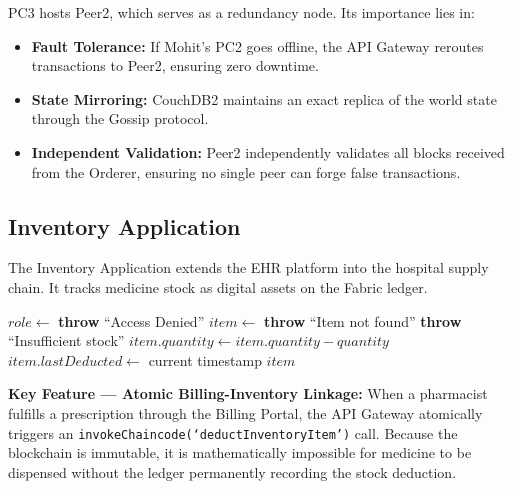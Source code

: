 PC3 hosts Peer2, which serves as a redundancy node. Its importance lies in:

\begin{itemize}
    \item \textbf{Fault Tolerance:} If Mohit's PC2 goes offline, the API Gateway reroutes transactions to Peer2, ensuring zero downtime.
    \item \textbf{State Mirroring:} CouchDB2 maintains an exact replica of the world state through the Gossip protocol.
    \item \textbf{Independent Validation:} Peer2 independently validates all blocks received from the Orderer, ensuring no single peer can forge false transactions.
\end{itemize}

\subsection{Inventory Application}

The Inventory Application extends the EHR platform into the hospital supply chain. It tracks medicine stock as digital assets on the Fabric ledger.

\begin{algorithm}[H]
\caption{Inventory Deduction with Fraud Prevention}
\label{alg:inventory}
\begin{algorithmic}[1]
    \State $role \gets$ 
        \State \textbf{throw} ``Access Denied''
    \EndIf
    \State $item \gets$ 
        \State \textbf{throw} ``Item not found''
    \EndIf
        \State \textbf{throw} ``Insufficient stock''
    \EndIf
    \State $item.quantity \gets item.quantity - quantity$
    \State $item.lastDeducted \gets$ current timestamp
    \State {}
    \State \Return $item$
\EndProcedure
\end{algorithmic}
\end{algorithm}

\textbf{Key Feature — Atomic Billing-Inventory Linkage:} When a pharmacist fulfills a prescription through the Billing Portal, the API Gateway atomically triggers an \texttt{invokeChaincode(`deductInventoryItem')} call. Because the blockchain is immutable, it is mathematically impossible for medicine to be dispensed without the ledger permanently recording the stock deduction.

